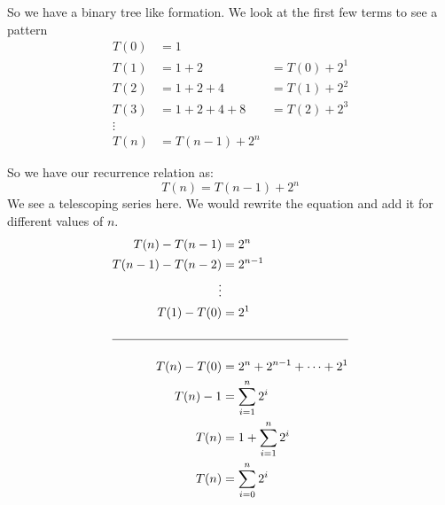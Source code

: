 \documentclass[addpoints]{exam}
\begin{document}
\begin{questions}
\begin{solution}
		So we have a binary tree like formation. We look at the first few terms to see a pattern
		\begin{align*}
			T(0) & = 1                            \\
			T(1) & = 1 + 2         & = T(0) + 2^1 \\
			T(2) & = 1 + 2 + 4     & = T(1) + 2^2 \\
			T(3) & = 1 + 2 + 4 + 8 & = T(2) + 2^3 \\
			\vdots                                \\
			T(n) & = T(n-1) + 2^n
		\end{align*}

		So we have our recurrence relation as:
		\[T(n) = T(n-1) + 2^n\]
		We see a telescoping series here. We would rewrite the equation and add it for different values of \(n\).
		\begin{equation*}
			\begin{aligned}
				T(n) - T(n-1)   & = 2^n                          \\
				T(n-1) - T(n-2) & = 2^{n-1}                      \\
				\vdots                                           \\
				T(1) - T(0)     & = 2^1                          \\\\\hline\\
				T(n) - T(0)     & = 2^n + 2^{n-1} + \cdots + 2^1 \\
				T(n) - 1        & = \sum_{i=1}^{n} 2^i           \\
				T(n)            & = 1 + \sum_{i=1}^{n} 2^i       \\
				T(n)            & = \sum_{i=0}^{n} 2^i
			\end{aligned}
		\end{equation*}


\end{solution}
\end{questions}
\end{document}
